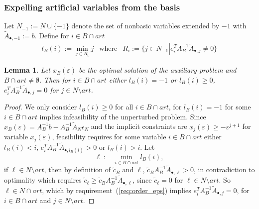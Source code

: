 \documentclass[a4paper]{article}
\newtheorem{lemma}{Lemma}
\begin{document}
\subsubsection{Expelling artificial variables from the basis}
Let $N_{-1}:=N \cup \{-1\}$ denote the set of nonbasic variables extended
by $-1$ with $\tilde{A}_{\bullet, -1}:=b$. Define for $i \in B \cap art$
\begin{eqnarray*}
  l_{B}\left(i\right):=\min_{j \in R_{i}} j & \text{where}&
  R_{i}:=\{ j \in N_{-1} \left| \right.
  e_{i}^{T}A_{B}^{-1}\tilde{A}_{\bullet, j} \neq 0 \}
\end{eqnarray*}
\begin{lemma}
\label{lem:art_BxN_zero}
Let $x_{B}(\varepsilon)$ be the optimal solution of the auxiliary problem and
$B \cap art \neq \emptyset$. Then for $i \in B \cap art$ either
$l_{B}\left(i\right) = -1$ or $l_{B}\left(i\right) \geq 0$,
$e_{i}^{T}A_{B}^{-1}\tilde{A}_{\bullet,j} = 0$
for $j \in N \setminus art$.
\end{lemma}
\begin{proof}
We only consider $l_{B}\left(i\right) \geq 0$ for all $i \in B \cap art$, for
$l_{B}\left(i\right) = -1$ for some $i \in B \cap art$ implies infeasibility of
the unperturbed problem. 
Since $x_{B}(\varepsilon) = A_{B}^{-1}b - A_{B}^{-1}
\tilde{A}_{N}\epsilon_{N}$
and the implicit constraints are $x_{j}(\varepsilon) \geq -\varepsilon^{j+1}$
for variable $x_{j}(\varepsilon)$, feasibility requires
for some variable $i \in B \cap art$ either $l_{B}\left(i\right) < i$,
$e_{i}^{T}A_{B}^{-1}\tilde{A}_{\bullet, l_{B}\left(i\right)} > 0$ or
$l_{B}\left(i\right) > i$. Let
\begin{equation*}
  \ell:= \min_{i \in B \cap art} l_{B}\left(i\right),
\end{equation*}
if $\ell \in N \setminus art$,
then by definition of $\tilde{c}_{B}$ and $\ell$,
$\tilde{c}_{B}A_{B}^{-1}\tilde{A}_{\bullet, \ell} > 0$,
in contradiction to optimality which requires
$\tilde{c}_{\ell} \geq
\tilde{c}_{B}A_{B}^{-1}\tilde{A}_{\bullet, \ell}$,
since $\tilde{c}_{\ell}=0$ for 
$\ell \in N \setminus art$.
So $\ell \in N \cap art$, which by requirement~(\ref{req:order_eps}) implies
$e_{i}^{T}A_{B}^{-1}\tilde{A}_{\bullet, j}=0$, for
$i \in B \cap art$ and $j \in N \setminus art$. 
\end{proof}
\end{document}

